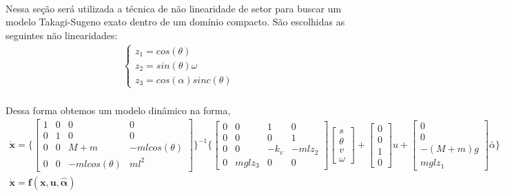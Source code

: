 \documentclass[a4paper,10pt]{article}
\begin{document}
\paragraph{}Nessa seção será utilizada a técnica de não linearidade de setor para buscar um modelo Takagi-Sugeno exato dentro de um domínio compacto. São escolhidas as seguintes não linearidades:
\begin{gather}
	\begin{cases}
		z_1 = cos(\theta) \\
		z_2 = sin(\theta)\omega \\
		z_3 = cos(\alpha)sinc(\theta)
	\end{cases}
\end{gather}
 \paragraph{}Dessa forma obtemos um modelo dinâmico na forma,
 \begin{gather}
 	 	\dot{\bm{x}} =  
 	 	\Biggl\{\begin{bmatrix}
 	 		1 & 0 & 0 & 0 \\
 	 		0 & 1 & 0 & 0 \\
 	 		0 & 0 & M+m & -mlcos(\theta) \\
 	 		0 & 0 & -mlcos(\theta) & ml^2
 	 	\end{bmatrix}\Biggr\}^{-1}	\Biggl\{\begin{bmatrix}
 			0 & 0 & 1 & 0 \\
 			0 & 0 & 0 & 1 \\
 			0 & 0 & -k_v & -mlz_2 \\
 			0 & mglz_3 & 0 & 0
 		\end{bmatrix}\begin{bmatrix}
 			s \\ \theta \\ v \\ \omega
 		\end{bmatrix} 
 		+ \begin{bmatrix}
 			0 \\ 0 \\ 1 \\ 0
 		\end{bmatrix}u + \begin{bmatrix}
 			0 \\ 0 \\ -(M+m)g \\ mglz_1
 		\end{bmatrix}\bar{\alpha}	\Biggl\} \\
 	\dot{\bm{x}} = \bm{f(\bm{x},\bm{u},\bm{\hat{\alpha}})}
 \end{gather}
\end{document}
